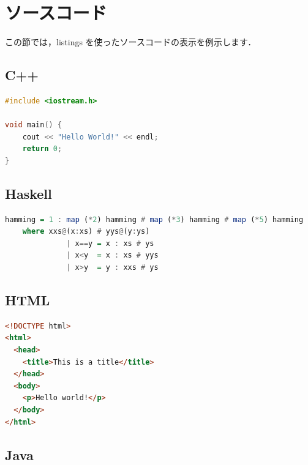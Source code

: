 
\section{ソースコード}

この節では，listings を使ったソースコードの表示を例示します．

\subsection{C++}

\begin{pre}
\begin{lstlisting}[language=C++]
#include <iostream.h>

void main() {
    cout << "Hello World!" << endl;
    return 0;
}
\end{lstlisting}
\end{pre}

\subsection{Haskell}

\begin{pre}
\begin{lstlisting}[language=Haskell]
hamming = 1 : map (*2) hamming # map (*3) hamming # map (*5) hamming
    where xxs@(x:xs) # yys@(y:ys)
              | x==y = x : xs # ys
              | x<y  = x : xs # yys
              | x>y  = y : xxs # ys
\end{lstlisting}
\end{pre}

\subsection{HTML}

\begin{pre}
\begin{lstlisting}[language=html]
<!DOCTYPE html>
<html>
  <head>
    <title>This is a title</title>
  </head>
  <body>
    <p>Hello world!</p>
  </body>
</html>
\end{lstlisting}
\end{pre}

\subsection{Java}

